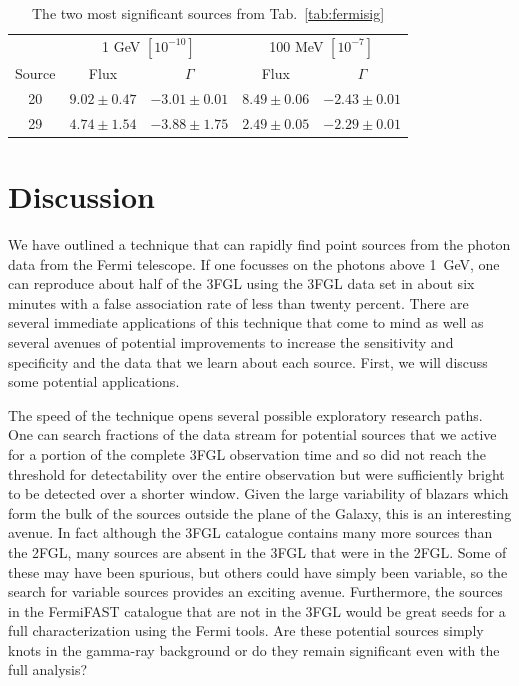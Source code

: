 \documentclass[useAMS,usenatbib]{mn2e}
\begin{document}
\begin{table}
  \caption{The two most significant sources from Tab.~\ref{tab:fermisig}}
  \label{tab:refit}
\begin{tabular}{crrrr}
  \hline
           & \multicolumn{2}{c}{1 GeV $[10^{-10}]$} & \multicolumn{2}{c}{100 MeV $[10^{-7}]$} \\
    Source & \multicolumn{1}{c}{Flux} & \multicolumn{1}{c}{$\Gamma$}  & \multicolumn{1}{c}{Flux}  &\multicolumn{1}{c}{$\Gamma$}
    \\
    \hline
    20  & $9.02\pm0.47$ & $-3.01\pm0.01$ & $8.49\pm0.06$ & $-2.43\pm0.01$ \\
    29  & $4.74\pm1.54$ & $-3.88\pm1.75$ & $2.49\pm0.05$ & $-2.29\pm0.01$ \\
\end{tabular}
\end{table}
\section{Discussion}
\label{sec:discussion}

We have outlined a technique that can rapidly find point sources from
the photon data from the Fermi telescope.  If one focusses on the
photons above 1~GeV, one can reproduce about half of the 3FGL using
the 3FGL data set in about six minutes with a false association rate of
less than twenty percent.  There are several immediate applications of
this technique that come to mind as well as several avenues of
potential improvements to increase the sensitivity and specificity
and the data that we learn about each source.  First, we will discuss
some potential applications.

The speed of the technique opens several possible exploratory research
paths.  One can search fractions of the data stream for potential
sources that we active for a portion of the complete 3FGL observation
time and so did not reach the threshold for detectability over the
entire observation but were sufficiently bright to be detected over a
shorter window.  Given the large variability of blazars which form the
bulk of the sources outside the plane of the Galaxy, this is an
interesting avenue.  In fact although the 3FGL catalogue contains many
more sources than the 2FGL, many sources are absent in the 3FGL that
were in the 2FGL.  Some of these may have been spurious, but others
could have simply been variable, so the search for variable sources
provides an exciting avenue.  Furthermore, the sources in the
FermiFAST catalogue that are not in the 3FGL would be great seeds for
a full characterization using the Fermi tools.  Are these potential
sources simply knots in the gamma-ray background or do they remain
significant even with the full analysis?
\end{document}
